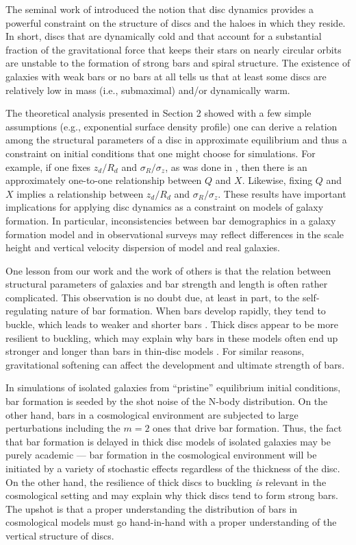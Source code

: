 The seminal work of \citet{PeeblesOstriker1973} introduced the notion
that disc dynamics provides a powerful constraint on the structure of
discs and the haloes in which they reside.  In short, discs that are
dynamically cold and that account for a substantial fraction of the
gravitational force that keeps their stars on nearly circular orbits
are unstable to the formation of strong bars and spiral structure.
The existence of galaxies with weak bars or no bars at all tells us
that at least some discs are relatively low in mass (i.e., submaximal)
and/or dynamically warm.

The theoretical analysis presented in Section 2 showed with a few
simple assumptions (e.g., exponential surface density profile) one can
derive a relation among the structural parameters of a disc in
approximate equilibrium and thus a constraint on initial conditions
that one might choose for simulations.  For example, if one fixes
$z_d/R_d$ and $\sigma_R/\sigma_z$, as was done in
\citet{YurinSpringelStellarDisks}, then there is an approximately
one-to-one relationship between $Q$ and $X$.  Likewise, fixing $Q$ and
$X$ implies a relationship between $z_d/R_d$ and $\sigma_R/\sigma_z$.
These results have important implications for applying disc dynamics
as a constraint on models of galaxy formation.  In particular,
inconsistencies between bar demographics in a galaxy formation model
and in observational surveys may reflect differences in the scale
height and vertical velocity dispersion of model and real galaxies.

One lesson from our work and the work of others is that the relation
between structural parameters of galaxies and bar strength and length
is often rather complicated.  This observation is no doubt due, at
least in part, to the self-regulating nature of bar formation.  When
bars develop rapidly, they tend to buckle, which leads to weaker and
shorter bars \citep{VP2004}.  Thick discs appear to be more resilient
to buckling, which may explain why bars in these models often end up
stronger and longer than bars in thin-disc models \citep{Klypin2009}.
For similar reasons, gravitational softening can affect the
development and ultimate strength of bars.

In simulations of isolated galaxies from ``pristine'' equilibrium
initial conditions, bar formation is seeded by the shot noise of the
N-body distribution.  On the other hand, bars in a cosmological
environment are subjected to large perturbations including the $m=2$
ones that drive bar formation.  Thus, the fact that bar formation is
delayed in thick disc models of isolated galaxies may be purely
academic --- bar formation in the cosmological environment will be
initiated by a variety of stochastic effects regardless of the
thickness of the disc.  On the other hand, the resilience of thick
discs to buckling {\it is} relevant in the cosmological setting and
may explain why thick discs tend to form strong bars.  The upshot is 
that a proper understanding the distribution of bars in cosmological models
must go hand-in-hand with a proper understanding of the vertical 
structure of discs.

